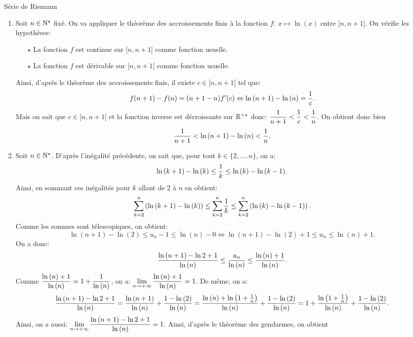 \documentclass[a4paper, 11pt,reqno]{article}
\begin{document}
\begin{correction}  \;
	S\'erie de Riemann
	\begin{enumerate}
		\item Soit $n\in\mathbb{N}^{\star}$ fix\'e. On va appliquer le th\'eor\`eme des accroissements finis \`a la fonction $f:\ x\mapsto \ln{(x)}$ entre
		      $\lbrack n,n+1\rbrack$. On v\'erifie les hypoth\`eses:
		      \begin{itemize}
			      \item[$\star$] La fonction $f$ est continue sur $\lbrack n,n+1\rbrack$ comme fonction usuelle.
			      \item[$\star$]  La fonction $f$ est d\'erivable sur $\rbrack n,n+1\lbrack$ comme fonction usuelle.
		      \end{itemize}
		      Ainsi, d'apr\`es le th\'eor\`eme des accroissements finis, il existe $c\in\rbrack n,n+1\lbrack$ tel que:
		      $$f(n+1)-f(n)=(n+1-n)f^{\prime}(c)\Leftrightarrow \ln{(n+1)}-\ln{(n)}=\displaystyle\frac{1}{c}.$$
		      Mais on sait que $c\in\rbrack n,n+1\lbrack$ et la fonction inverse est d\'ecroissante sur $\mathbb{R}^{+\star}$ donc: $\displaystyle\frac{1}{n+1}<\displaystyle\frac{1}{c}<\displaystyle\frac{1}{n}$. On obtient donc bien
		      $$\displaystyle\frac{1}{n+1}<\ln{(n+1)}-\ln{(n)}<\displaystyle\frac{1}{n}.$$
		\item Soit $n\in\mathbb{N}^{\star}$. D'apr\`es l'in\'egalit\'e pr\'ec\'edente, on sait que, pour tout $k\in\lbrace 2,\dots,n\rbrace$, on a:
		      $$\ln{(k+1)}-\ln{(k)}\leq \displaystyle\frac{1}{k}\leq \ln{(k)}-\ln{(k-1)}.$$
		      Ainsi, en sommant ces in\'egalit\'es pour $k$ allant de 2 \`a $n$ en obtient:
		      $$\sum\limits_{k=2}^n \left( \ln{(k+1)}-\ln{(k)}  \right)\leq \sum\limits_{k=2}^n \displaystyle\frac{1}{k}\leq \sum\limits_{k=2}^n \left( \ln{(k)}-\ln{(k-1)} \right) .$$
		      Comme les sommes sont t\'elescopiques, on obtient:
		      $$\ln{(n+1)}-\ln{(2)}\leq u_n-1\leq \ln{(n)}-0\Leftrightarrow \ln{(n+1)}-\ln{(2)}+1\leq u_n\leq \ln{(n)}+1.$$
		      On a donc:
		      $$\displaystyle\frac{\ln{(n+1)}  -\ln{2}+1 }{\ln{(n)}}\leq \displaystyle\frac{u_n}{\ln{(n)}}\leq \displaystyle\frac{\ln{(n)} +1}{\ln{(n)}}.$$
		      Comme $\displaystyle\frac{\ln{(n)} +1}{\ln{(n)}}=1+\displaystyle\frac{1}{\ln{(n)}}$, on a: $\lim\limits_{n\to +\infty} \displaystyle\frac{\ln{(n)} +1}{\ln{(n)}}=1$. De m\^eme, on a:
		      $$\displaystyle\frac{\ln{(n+1)}  -\ln{2}+1 }{\ln{(n)}}=\displaystyle\frac{\ln{(n+1)}}{\ln{(n)}}+\displaystyle\frac{1-\ln{(2)}}{\ln{(n)}}=\displaystyle\frac{\ln{(n)}+\ln{\left(1+\frac{1}{n}\right)}}{\ln{(n)}} +\displaystyle\frac{1-\ln{(2)}}{\ln{(n)}}=1+\displaystyle\frac{\ln{\left(1+\frac{1}{n}\right)}}{\ln{(n)}} +\displaystyle\frac{1-\ln{(2)}}{\ln{(n)}}.$$
		      Ainsi, on a aussi: $\lim\limits_{n\to +\infty} \displaystyle\frac{\ln{(n+1)}  -\ln{2}+1 }{\ln{(n)}}=1$. Ainsi, d'apr\`es le th\'eor\`eme des gendarmes, on obtient

\end{enumerate}
\end{correction}
\end{document}
